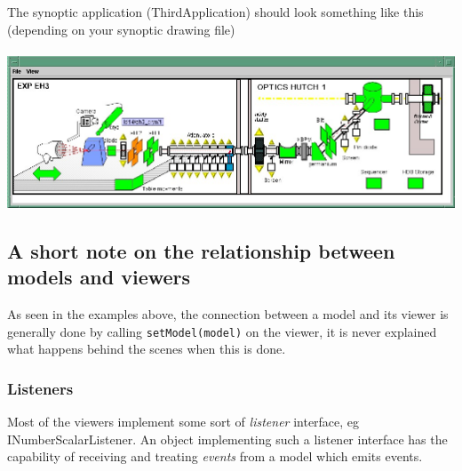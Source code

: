 The synoptic application (ThirdApplication) should
look something like this (depending on your synoptic drawing file)\\
\\
\includegraphics[scale=0.4]{atk/img/prog_guide_exple3}

\subsection{A short note on the relationship between models and viewers}

As seen in the examples above, the connection between a model
and its viewer is generally done by calling \texttt{setModel(model)}
on the viewer, it is never explained what happens behind
the scenes when this is done.

\subsubsection{Listeners}

Most of the viewers implement some sort of \emph{listener}
interface, eg INumberScalarListener.
An object implementing such a listener interface has the capability
of receiving and treating \emph{events} from a model
which emits events.

